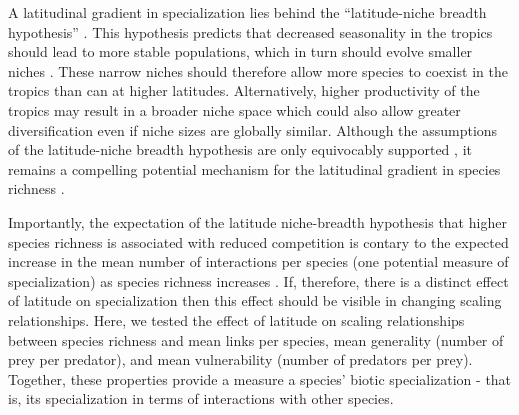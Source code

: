 \documentclass[12pt]{article}
\begin{document}
A latitudinal gradient in specialization lies behind the ``latitude-niche breadth hypothesis'' \citep{Vazquez2004}.
This hypothesis predicts that decreased seasonality in the tropics should lead to more stable populations, which in
turn should evolve smaller niches \citep{Vazquez2004}. These narrow niches should therefore allow more species to 
coexist in the tropics than can at higher latitudes. Alternatively, higher productivity of the tropics \citep{Brown2004}
may result in a broader niche space \citep{Davies2007} which could also allow greater diversification even if niche 
sizes are globally similar. Although the assumptions of the latitude-niche breadth hypothesis are only equivocably 
supported \citep{Vazquez2004}, it remains a compelling potential mechanism for the latitudinal gradient in species 
richness \citep{Lappalainen2006,Krasnov2008,Slove2010}. 


Importantly, the expectation of the latitude niche-breadth hypothesis that higher species richness is associated with 
reduced competition is contary to the expected increase in the mean number of interactions per species (one potential 
measure of specialization) as species richness increases \citep{Dunne2006,Riede2010}. If, therefore, there is a
distinct effect of latitude on specialization then this effect should be visible in changing scaling relationships.
Here, we tested the effect of latitude on scaling relationships between species richness and mean links per species, 
mean generality (number of prey per predator), and mean vulnerability (number of predators per prey). Together, these
properties provide a measure a species' biotic specialization - that is, its specialization in terms of interactions 
with other species.


\end{document}
